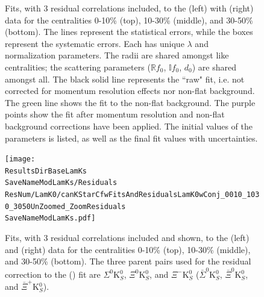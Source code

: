 \documentclass[../AnalysisNoteJBuxton.tex]{subfiles}
\renewcommand{\ResNum}{_3Res}
\renewcommand{\SaveNameModLamKch}{\MomRes\NonFlatBgd\ResNum\PrimMaxDecay\ResMethod\ParamFixAndShareLamKch}
\renewcommand{\SaveNameModLamKs}{\MomRes\NonFlatBgd\ResNum\PrimMaxDecay\ResMethod\ParamFixAndShareLamKs}
\begin{document}
\begin{landscape}
\begin{figure}[h!]
  \centering
  \caption[\LamKchMALamKchP Fits with 3 Residuals]{Fits, with 3 residual correlations included, to the \LamKchM(left) with \ALamKchP (right) data for the centralities 0-10\% (top), 10-30\% (middle), and 30-50\% (bottom).
The lines represent the statistical errors, while the boxes represent the systematic errors.  
Each has unique $\lambda$ and normalization parameters.
The radii are shared amongst like centralities; the scattering parameters ($\mathbb{R}f_{0}$, $\mathbb{I}f_{0}$, $d_{0}$) are shared amongst all.
The black solid line represents the ``raw" fit, i.e. not corrected for momentum resolution effects nor non-flat background.  
The green line shows the fit to the non-flat background.
The purple points show the fit after momentum resolution and non-flat background corrections have been applied.
The initial values of the parameters is listed, as well as the final fit values with uncertainties.}
  \label{fig:LamKchMwConjFits_3Res}
\end{figure}


\begin{figure}[h]
  \centering
  \texttt{[image: \\ResultsDirBaseLamKs\\SaveNameModLamKs/Residuals\\ResNum/LamK0/canKStarCfwFitsAndResidualsLamK0wConj\_0010\_1030\_3050UnZoomed\_ZoomResiduals\\SaveNameModLamKs.pdf]}
  \caption[\LamALamKs Fits showing 3 Residuals]{Fits, with 3 residual correlations included and shown, to the \LamKs (left) and \ALamKs (right) data for the centralities 0-10\% (top), 10-30\% (middle), and 30-50\% (bottom).  The three parent pairs used for the residual correction to the \LamKs (\ALamKs) fit are $\Sigma^{0}$K$^{0}_{S}$, $\Xi^{0}$K$^{0}_{S}$, and $\Xi^{-}$K$^{0}_{S}$ ($\bar{\Sigma}^{0}$K$^{0}_{S}$, $\bar{\Xi}^{0}$K$^{0}_{S}$, and $\bar{\Xi}^{+}$K$^{0}_{S}$).}
  \label{fig:LamK0wConjFitsAndResiduals_3Res}
\end{figure}





\end{landscape}
\end{document}

